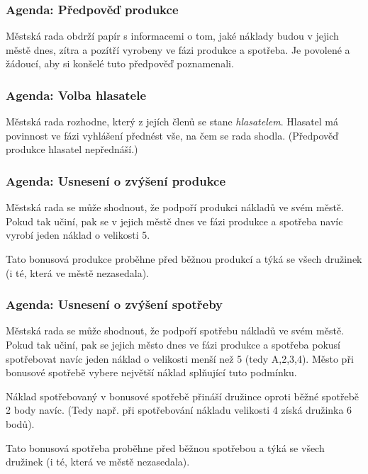 \documentclass[a4paper, 12pt, twoside]{article}
\begin{document}
\subsubsection{Agenda: Předpověď produkce}

Městská rada obdrží papír s informacemi o tom, jaké náklady budou v jejich městě dnes, zítra a pozítří vyrobeny ve fázi produkce a spotřeba.
Je povolené a žádoucí, aby si konšelé tuto předpověď poznamenali.

\subsubsection{Agenda: Volba hlasatele}
\label{volba_hlasatele}

Městská rada rozhodne, který z jejích členů se stane \emph{hlasatelem}.  Hlasatel má povinnost ve fázi vyhlášení přednést vše, na čem se rada
shodla.  (Předpověď produkce hlasatel nepřednáší.)

\subsubsection{Agenda: Usnesení o zvýšení produkce}
\label{agenda_produkce}

Městská rada se může shodnout, že podpoří produkci nákladů ve svém městě.  Pokud tak učiní, pak se v jejich městě dnes ve fázi produkce a spotřeba navíc vyrobí
jeden náklad o velikosti 5.

Tato bonusová produkce proběhne před běžnou produkcí a týká se všech družinek (i té, která ve městě nezasedala).

\subsubsection{Agenda: Usnesení o zvýšení spotřeby}
\label{agenda_spotreba}

Městská rada se může shodnout, že podpoří spotřebu nákladů ve svém městě.  Pokud tak učiní, pak se jejich město dnes ve fázi produkce a spotřeba pokusí 
spotřebovat navíc jeden náklad o velikosti menší než 5 (tedy A,2,3,4).  Město při bonusové spotřebě vybere největší náklad splňující tuto podmínku.

Náklad spotřebovaný v bonusové spotřebě přináší družince oproti běžné spotřebě 2 body navíc.  (Tedy např. při spotřebování nákladu velikosti 4 získá družinka 6 bodů).

Tato bonusová spotřeba proběhne před běžnou spotřebou a týká se všech družinek (i té, která ve městě nezasedala).
\end{document}
